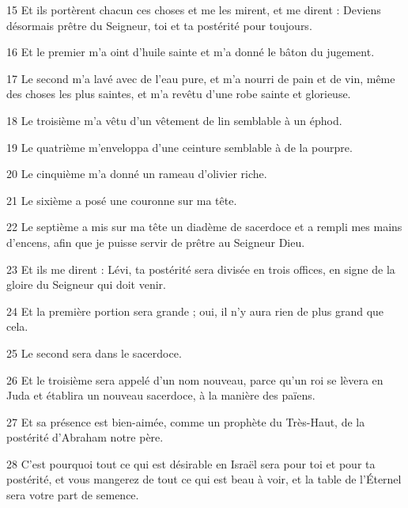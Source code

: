\par 15 Et ils portèrent chacun ces choses et me les mirent, et me dirent : Deviens désormais prêtre du Seigneur, toi et ta postérité pour toujours.

\par 16 Et le premier m'a oint d'huile sainte et m'a donné le bâton du jugement.

\par 17 Le second m'a lavé avec de l'eau pure, et m'a nourri de pain et de vin, même des choses les plus saintes, et m'a revêtu d'une robe sainte et glorieuse.

\par 18 Le troisième m'a vêtu d'un vêtement de lin semblable à un éphod.

\par 19 Le quatrième m'enveloppa d'une ceinture semblable à de la pourpre.

\par 20 Le cinquième m'a donné un rameau d'olivier riche.

\par 21 Le sixième a posé une couronne sur ma tête.

\par 22 Le septième a mis sur ma tête un diadème de sacerdoce et a rempli mes mains d'encens, afin que je puisse servir de prêtre au Seigneur Dieu.

\par 23 Et ils me dirent : Lévi, ta postérité sera divisée en trois offices, en signe de la gloire du Seigneur qui doit venir.

\par 24 Et la première portion sera grande ; oui, il n'y aura rien de plus grand que cela.

\par 25 Le second sera dans le sacerdoce.

\par 26 Et le troisième sera appelé d'un nom nouveau, parce qu'un roi se lèvera en Juda et établira un nouveau sacerdoce, à la manière des païens.

\par 27 Et sa présence est bien-aimée, comme un prophète du Très-Haut, de la postérité d'Abraham notre père.

\par 28 C'est pourquoi tout ce qui est désirable en Israël sera pour toi et pour ta postérité, et vous mangerez de tout ce qui est beau à voir, et la table de l'Éternel sera votre part de semence.

